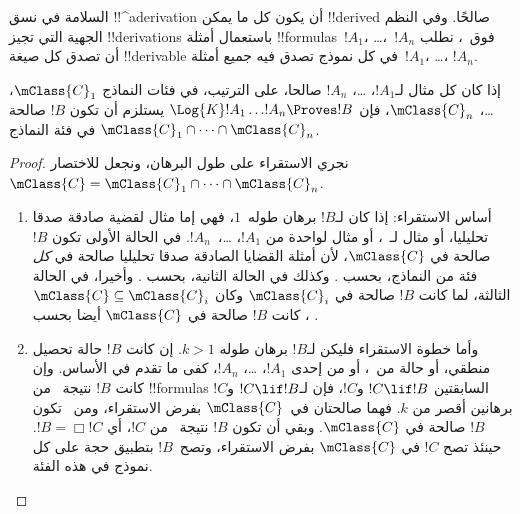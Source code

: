 \documentclass[../../../include/open-logic-section]{subfiles}
\begin{document}


السلامة في نسق !!^a{derivation} أن يكون كل ما يمكن !!{derive}d
صالحًا. وفي النظم الجهية التي تجيز !!{derivation}s باستعمال
أمثلة !!{formula}s~$!A_1$، \dots،~$!A_n$ فوق~،
نطلب أن تصدق كل صيغة !!{derivable} في كل نموذج تصدق فيه
جميع أمثلة~$!A_1$، \dots، $!A_n$.

\begin{thm}
  إذا كان كل مثال لـ$!A_1$، \dots، $!A_n$ صالحا، على الترتيب، في
  فئات النماذج $\mClass{C}_1$، \dots، $\mClass{C}_n$، فإن
  $\Log{K}!A_1\dots !A_n \Proves !B$ يستلزم أن تكون $!B$ صالحة في
  فئة النماذج $\mClass{C}_1 \cap \dots \cap \mClass{C}_n$.
\end{thm}

\begin{proof}
  نجري الاستقراء على طول البرهان، ونجعل للاختصار
  $\mClass{C} =
  \mClass{C}_1 \cap \dots \cap \mClass{C}_n$.
  \begin{enumerate}
  \item أساس الاستقراء: إذا كان لـ$!B$ برهان طوله~$1$، فهي إما مثال
    لقضية صادقة صدقا تحليليا، أو مثال لـ~،
     أو مثال لواحدة من $!A_1$،
    \dots،~$!A_n$. في الحالة الأولى تكون $!B$ صالحة في
    $\mClass{C}$، لأن أمثلة القضايا الصادقة صدقا تحليليا صالحة في
    \emph{كل} فئة من النماذج، بحسب .
    وكذلك في الحالة الثانية، بحسب
    . وأخيرا، في الحالة الثالثة،
    لما كانت $!B$ صالحة في $\mClass{C}_i$ وكان $\mClass{C} \subseteq
    \mClass{C}_i$، كانت $!B$ صالحة في $\mClass{C}$ أيضا بحسب
    .
  \item وأما خطوة الاستقراء فليكن لـ$!B$ برهان طوله $k>1$.
    إن كانت $!B$ حالة تحصيل منطقي، أو حالة من~،
     أو من إحدى
    $!A_1$، \dots، $!A_n$، كفى ما تقدم في الأساس.
    وإن كانت $!B$ نتيجة~\MP{} من !!{formula}s السابقتين
    $!C \lif !B$ و$!C$، فإن لـ$!C \lif !B$ و$!C$ برهانين
    أقصر من $k$. فهما صالحتان في~$\mClass{C}$ بفرض الاستقراء،
    ومن~ تكون $!B$ صالحة في
    $\mClass{C}$. وبقي أن تكون $!B$ نتيجة~\Nec{} من $!C$،
    أي $!B = \Box!C$. حينئذ تصح $!C$ في $\mClass{C}$
    بفرض الاستقراء، وتصح~$!B$ بتطبيق حجة
     على كل نموذج في هذه الفئة.
  \end{enumerate}
\end{proof}
\end{document}
